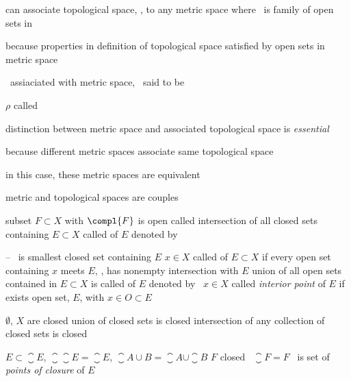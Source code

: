 \documentclass[17pt,landscape]{foils}
\newcommand\bitem{\item [$\because$]}
\newcommand{\tXJ}{\topos{X}{J}}
\newcommand{\tJ}{\topol{J}}
\begin{document}
{{

\bit
	\item can associate topological space, , to any metric space 
		where \tJ\ is family of open sets in 

	\bit
		\bitem because properties in definition of topological space
			satisfied by open sets in metric space
	\eit

	\vitem {}\ assiaciated with metric space, \ said to be 

	\bit
		\item $\rho$ called  \tXJ\
	\eit

	\vitem distinction between metric space and associated topological space is \emph{essential}
	\bit
		\bitem because different metric spaces associate same topological space
		\item in this case, these metric spaces are equivalent
	\eit

	\vitem metric and topological spaces are couples
\eit



\bit
	\item subset $F\subset X$ with $\compl{F}$ is open called 
	\vitem intersection of all closed sets containing $E\subset X$ called  of $E$ denoted by \
	\bit
		\item [--] \closure{E}\ is smallest closed set containing $E$
	\eit
	\vitem $x\in X$ called \define{point of closure} of $E\subset X$
		if every open set containing $x$ meets $E$,
		\ie, has nonempty intersection with $E$
	\vitem union of all open sets contained in $E\subset X$ is called  of $E$ denoted by \
	\vitem $x\in X$ called \emph{interior point} of $E$ if exists open set, $E$, with $x\in O\subset E$
\eit



\bit
	\item $\emptyset$, $X$ are closed
	\vitem union of closed sets is closed
	\vitem intersection of any collection of closed sets is closed

	\vvitem $E\subset \closure{E}$, $\closure{\closure{E}} = \closure{E}$, $\closure{A\cup B} = \closure{A} \cup \closure{B}$
	\vitem $F$ closed \iaoi\ $\closure{F}=F$
	\vitem {}\ is set of \emph{points of closure} of $E$

}}
\end{document}
